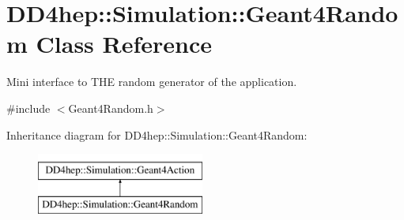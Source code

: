 \hypertarget{class_d_d4hep_1_1_simulation_1_1_geant4_random}{}\section{D\+D4hep\+:\+:Simulation\+:\+:Geant4\+Random Class Reference}
\label{class_d_d4hep_1_1_simulation_1_1_geant4_random}


Mini interface to T\+HE random generator of the application.  




{\ttfamily \#include $<$Geant4\+Random.\+h$>$}

Inheritance diagram for D\+D4hep\+:\+:Simulation\+:\+:Geant4\+Random\+:\begin{figure}[H]
\begin{center}
\leavevmode
\includegraphics[height=2.000000cm]{class_d_d4hep_1_1_simulation_1_1_geant4_random}
\end{center}
\end{figure}
